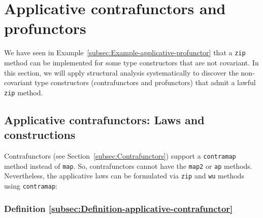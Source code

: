\section{Applicative contrafunctors and profunctors\label{sec:Applicative-contrafunctors-and-profunctors}}

We have seen in Example~\ref{subsec:Example-applicative-profunctor}
that a \lstinline!zip! method can be implemented for some type constructors
that are not covariant. In this section, we will apply structural
analysis systematically to discover the non-covariant type constructors
(contrafunctors and profunctors) that admit a lawful \lstinline!zip!
method.

\subsection{Applicative contrafunctors: Laws and constructions}

Contrafunctors (see Section~\ref{subsec:Contrafunctors}) support
a \lstinline!contramap! method instead of \lstinline!map!. So, contrafunctors
cannot have the \lstinline!map2! or \lstinline!ap! methods. Nevertheless,
the applicative laws can be formulated via \lstinline!zip! and \lstinline!wu!
methods using \lstinline!contramap!:

\subsubsection{Definition \label{subsec:Definition-applicative-contrafunctor}\ref{subsec:Definition-applicative-contrafunctor}}

